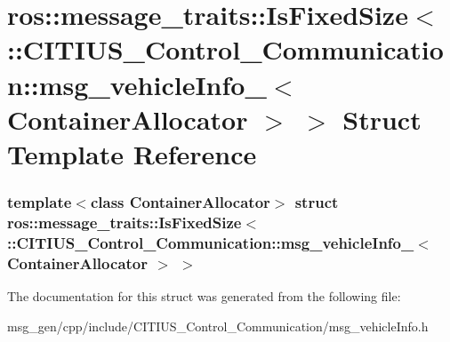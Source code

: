 \hypertarget{structros_1_1message__traits_1_1_is_fixed_size_3_01_1_1_c_i_t_i_u_s___control___communication_1_815cd9fec7295dfd0cfc569d4a552653}{\section{ros\-:\-:message\-\_\-traits\-:\-:\-Is\-Fixed\-Size$<$ \-:\-:\-C\-I\-T\-I\-U\-S\-\_\-\-Control\-\_\-\-Communication\-:\-:msg\-\_\-vehicle\-Info\-\_\-$<$ \-Container\-Allocator $>$ $>$ \-Struct \-Template \-Reference}
\label{structros_1_1message__traits_1_1_is_fixed_size_3_01_1_1_c_i_t_i_u_s___control___communication_1_815cd9fec7295dfd0cfc569d4a552653}
}
\subsubsection*{template$<$class Container\-Allocator$>$ struct ros\-::message\-\_\-traits\-::\-Is\-Fixed\-Size$<$ \-::\-C\-I\-T\-I\-U\-S\-\_\-\-Control\-\_\-\-Communication\-::msg\-\_\-vehicle\-Info\-\_\-$<$ Container\-Allocator $>$ $>$}



\-The documentation for this struct was generated from the following file\-:\begin{DoxyCompactItemize}
\item 
msg\-\_\-gen/cpp/include/\-C\-I\-T\-I\-U\-S\-\_\-\-Control\-\_\-\-Communication/msg\-\_\-vehicle\-Info.\-h\end{DoxyCompactItemize}
